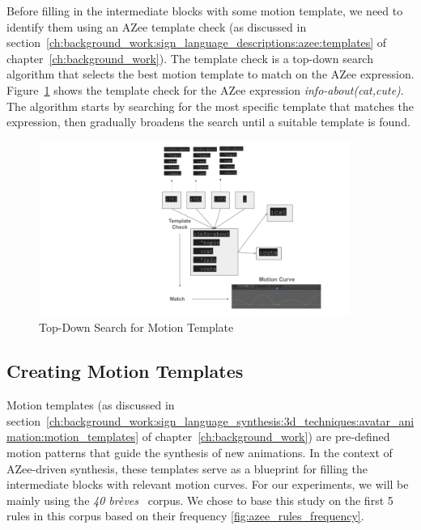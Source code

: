 \documentclass[../../main.tex]{subfiles}
\begin{document}
Before filling in the intermediate blocks with some motion template, we need to identify them using an AZee template check (as discussed in section~\ref{ch:background_work:sign_language_descriptions:azee:templates} of chapter~\ref{ch:background_work}). The template check is a top-down search algorithm that selects the best motion template to match on the AZee expression. Figure~\ref{fig:top_down_search_template} shows the template check for the AZee expression \emph{info-about(cat,cute)}. The algorithm starts by searching for the most specific template that matches the expression, then gradually broadens the search until a suitable template is found.

\begin{figure}
    \centering \includegraphics[width = 4in]{chapters/intermediate_blocks_pose_correction/images/top_down_search_template.png}
    \caption{Top-Down Search for Motion Template}
    \label{fig:top_down_search_template}
\end{figure}

\subsection{Creating Motion Templates}
\label{ch:intermediate_blocks_pose_correction:creating_motion_templates}

Motion templates (as discussed in section~\ref{ch:background_work:sign_language_synthesis:3d_techniques:avatar_animation:motion_templates} of chapter~\ref{ch:background_work}) are pre-defined motion patterns that guide the synthesis of new animations. In the context of AZee-driven synthesis, these templates serve as a blueprint for filling the intermediate blocks with relevant motion curves. For our experiments, we will be mainly using the \emph{40 brèves}~\cite{challant2022first} corpus. We chose to base this study on the first 5 rules in this corpus based on their frequency \ref{fig:azee_rules_frequency}.
\end{document}
